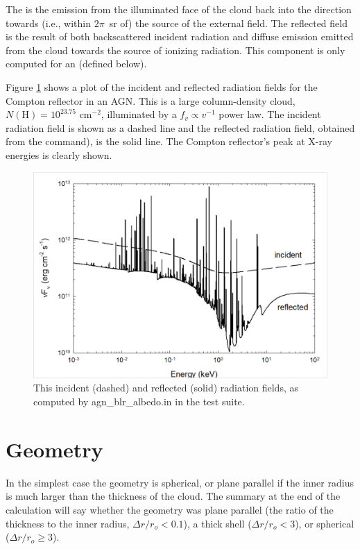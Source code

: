 The  is the emission
from the illuminated
face of the cloud back into the direction towards
(i.e., within $2\pi$~sr of)
the source of the external field.
The reflected field is the result
of both backscattered incident radiation and diffuse emission emitted from
the cloud towards the source of ionizing radiation.
This component is only
computed for an  (defined below).

Figure \ref{fig:incident_reflected} shows a plot of the incident and
reflected radiation fields for the Compton reflector in an AGN.
This is a large column-density cloud, $N(\mathrm{H}) = 10^{23.75}$
cm$^{-2}$, illuminated by a $f_v\propto v^{-1}$ power law.
The incident radiation field is shown as a
dashed line and the reflected radiation field, obtained from the  command),
is the solid line.
The Compton reflector's peak at X-ray
energies is clearly shown.

\begin{figure}
\centering
\includegraphics[scale=0.7]{incident_reflected}
\caption[Incident and reflected radiation field]{This incident (dashed) and reflected (solid)
radiation fields,
as computed by agn\_blr\_albedo.in in the test suite.}
\label{fig:incident_reflected}
\end{figure}

\section{Geometry}

In the simplest case the geometry is spherical, or plane
parallel if the inner radius is much larger than the thickness of the
cloud.
The summary at the end of the calculation will
say whether the geometry was plane parallel  (the ratio of the thickness
to the inner radius, $\Delta r/r_o < 0.1$), a thick shell ($\Delta r/r_o <
3$), or spherical
($\Delta r/r_o \ge 3$).

